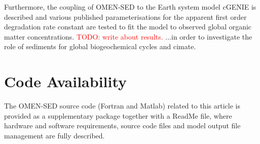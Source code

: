 \documentclass[gmd, manuscript]{copernicus}
\begin{document}
Furthermore, the coupling of OMEN-SED to the Earth system model cGENIE is described and various published parameterisations for the apparent first order degradation rate constant are tested to fit the model to observed global organic matter concentrations. 
\textcolor{red}{TODO: write about results.}
...in order to investigate the role of sediments for global biogeochemical cycles and cimate.

\section {Code Availability}
The OMEN-SED source code (Fortran and Matlab) related to this article is provided
as a supplementary package together with a ReadMe file,
where hardware and software requirements, source code files
and model output file management are fully described.

\appendix
\end{document}
